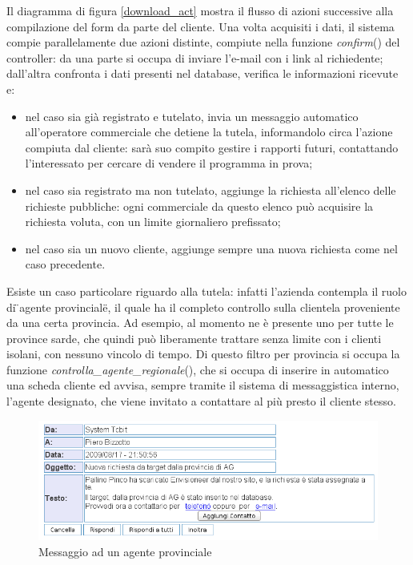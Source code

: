 \noindent
Il diagramma di figura \ref{download_act} mostra il flusso di azioni successive alla compilazione del form da parte del cliente. Una volta acquisiti i dati, il sistema compie parallelamente due azioni distinte, compiute nella funzione \textit{confirm}() del controller: da una parte si occupa di inviare l'e-mail con i link al richiedente; dall'altra confronta i dati presenti nel database, verifica le informazioni ricevute e:

\begin{itemize}
 \item nel caso sia gi\`a registrato e tutelato, invia un messaggio automatico all'operatore commerciale che detiene la tutela, informandolo circa l'azione compiuta dal cliente: sar\`a suo compito gestire i rapporti futuri, contattando l'interessato per cercare di vendere il programma in prova;
 \item nel caso sia registrato ma non tutelato, aggiunge la richiesta all'elenco delle richieste pubbliche: ogni commerciale da questo elenco pu\`o acquisire la richiesta voluta, con un limite giornaliero prefissato;
 \item nel caso sia un nuovo cliente, aggiunge sempre una nuova richiesta come nel caso precedente.
\end{itemize}

Esiste un caso particolare riguardo alla tutela: infatti l'azienda contempla il ruolo di \"{}agente provinciale\"{}, il quale ha il completo controllo sulla clientela proveniente da una certa provincia. Ad esempio, al momento ne \`e presente uno per tutte le province sarde, che quindi pu\`o liberamente trattare senza limite con i clienti isolani, con nessuno vincolo di tempo.
Di questo filtro per provincia si occupa la funzione \textit{controlla\_{}agente\_{}regionale}(), che si occupa di inserire in automatico una scheda cliente ed avvisa, sempre tramite il sistema di messaggistica interno, l'agente designato, che viene invitato a contattare al pi\`u presto il cliente stesso.

\begin{figure}[!ht]
\centering
  \includegraphics[scale=0.5]{./images/messaggioAgenteScreen.png}
\caption{Messaggio ad un agente provinciale}
\label{agent_message}
\end{figure}

